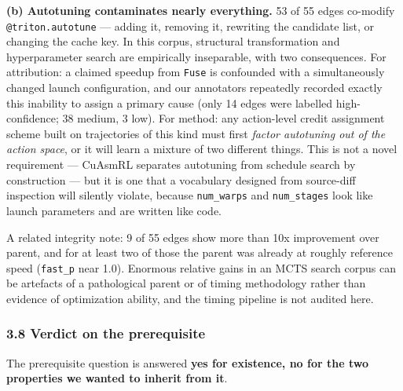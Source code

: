 \documentclass[
  11pt,
]{article}
\begin{document}
\textbf{(b) Autotuning contaminates nearly everything.} 53 of 55 edges co-modify \texttt{@triton.autotune} --- adding it, removing it, rewriting the candidate list, or changing the cache key. In this corpus, structural transformation and hyperparameter search are empirically inseparable, with two consequences. For attribution: a claimed speedup from \texttt{Fuse} is confounded with a simultaneously changed launch configuration, and our annotators repeatedly recorded exactly this inability to assign a primary cause (only 14 edges were labelled high-confidence; 38 medium, 3 low). For method: any action-level credit assignment scheme built on trajectories of this kind must first \emph{factor autotuning out of the action space}, or it will learn a mixture of two different things. This is not a novel requirement --- CuAsmRL separates autotuning from schedule search by construction \cite{cuasmrl30} --- but it is one that a vocabulary designed from source-diff inspection will silently violate, because \texttt{num\_warps} and \texttt{num\_stages} look like launch parameters and are written like code.

A related integrity note: 9 of 55 edges show more than 10x improvement over parent, and for at least two of those the parent was already at roughly reference speed (\texttt{fast\_p} near 1.0). Enormous relative gains in an MCTS search corpus can be artefacts of a pathological parent or of timing methodology rather than evidence of optimization ability, and the timing pipeline is not audited here.

\hypertarget{verdict-on-the-prerequisite}{%
\subsubsection{3.8 Verdict on the prerequisite}\label{verdict-on-the-prerequisite}}

The prerequisite question is answered \textbf{yes for existence, no for the two properties we wanted to inherit from it}.
\end{document}

